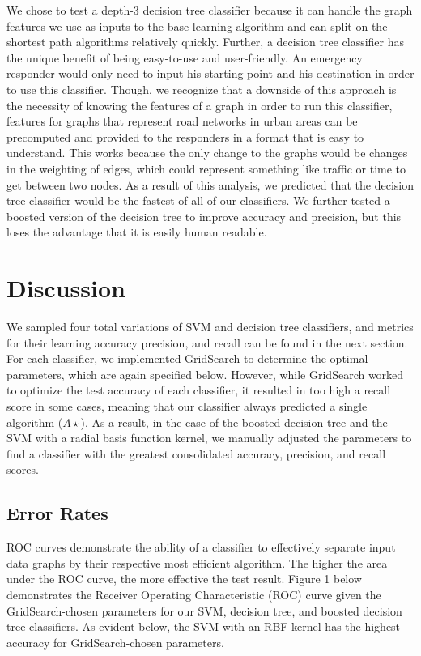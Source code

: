 \documentclass{article}
\begin{document}
We chose to test a depth-3 decision tree classifier because it can handle the graph features we use as inputs to the base learning algorithm and can split on the shortest path algorithms relatively quickly. Further, a decision tree classifier has the unique benefit of being easy-to-use and user-friendly. An emergency responder would only need to input his starting point and his destination in order to use this classifier. Though, we recognize that a downside of this approach is the necessity of knowing the features of a graph in order to run this classifier, features for graphs that represent road networks in urban areas can be precomputed and provided to the responders in a format that is easy to understand. This works because the only change to the graphs would be changes in the weighting of edges, which could represent something like traffic or time to get between two nodes. As a result of this analysis, we predicted that the decision tree classifier would be the fastest of all of our classifiers. We further tested a boosted version of the decision tree to improve accuracy and precision, but this loses the advantage that it is easily human readable.

\section{Discussion}

We sampled four total variations of SVM and decision tree classifiers, and metrics for their learning accuracy precision, and recall can be found in the next section. For each classifier, we implemented GridSearch to determine the optimal parameters, which are again specified below. However, while GridSearch worked to optimize the test accuracy of each classifier, it resulted in too high a recall score in some cases, meaning that our classifier always predicted a single algorithm ($A\star$). As a result, in the case of the boosted decision tree and the SVM with a radial basis function kernel, we manually adjusted the parameters to find a classifier with the greatest consolidated accuracy, precision, and recall scores.

\subsection{Error Rates}

ROC curves demonstrate the ability of a classifier to effectively separate input data graphs by their respective most efficient algorithm. The higher the area under the ROC curve, the more effective the test result. Figure 1 below demonstrates the Receiver Operating Characteristic (ROC) curve given the GridSearch-chosen parameters for our SVM, decision tree, and boosted decision tree classifiers. As evident below, the SVM with an RBF kernel has the highest accuracy for GridSearch-chosen parameters.
\end{document}
